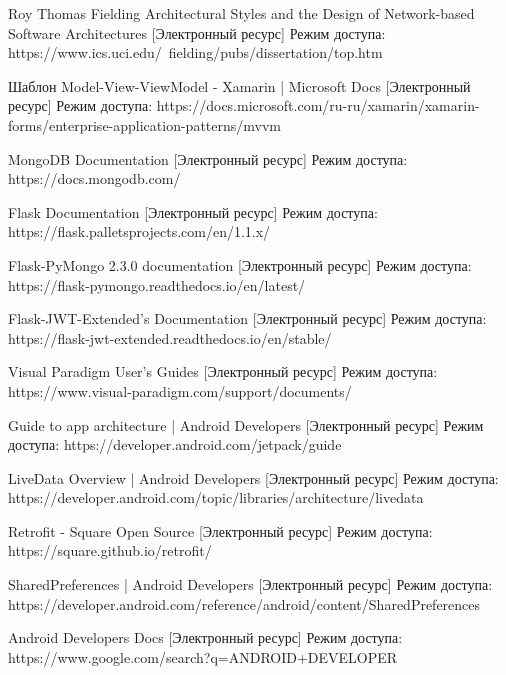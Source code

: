 \begingroup 
\renewcommand{\section}[2]{\anonsection{список использованных источников}}
\begin{thebibliography}{00}
	
Roy Thomas Fielding
Architectural Styles and the Design of Network-based Software Architectures
[Электронный ресурс] 
Режим доступа: https://www.ics.uci.edu/~fielding/pubs/dissertation/top.htm

Шаблон Model-View-ViewModel - Xamarin | Microsoft Docs
[Электронный ресурс]
Режим доступа:
https://docs.microsoft.com/ru-ru/xamarin/xamarin-forms/enterprise-application-patterns/mvvm

MongoDB Documentation 
[Электронный ресурс]
Режим доступа:
https://docs.mongodb.com/

Flask Documentation
[Электронный ресурс] 
Режим доступа:
https://flask.palletsprojects.com/en/1.1.x/

Flask-PyMongo 2.3.0 documentation
[Электронный ресурс]
Режим доступа:
https://flask-pymongo.readthedocs.io/en/latest/

Flask-JWT-Extended’s Documentation
[Электронный ресурс] 
Режим доступа:
https://flask-jwt-extended.readthedocs.io/en/stable/

Visual Paradigm User's Guides
[Электронный ресурс]
Режим доступа:
https://www.visual-paradigm.com/support/documents/

Guide to app architecture | Android Developers
[Электронный ресурс]
Режим доступа:
https://developer.android.com/jetpack/guide

LiveData Overview | Android Developers
[Электронный ресурс]
Режим доступа:
https://developer.android.com/topic/libraries/architecture/livedata

Retrofit - Square Open Source
[Электронный ресурс]
Режим доступа:
https://square.github.io/retrofit/


SharedPreferences | Android Developers
[Электронный ресурс]
Режим доступа:
https://developer.android.com/reference/android/content/SharedPreferences

Android Developers Docs
[Электронный ресурс]
Режим доступа:
https://www.google.com/search?q=ANDROID+DEVELOPER

\end{thebibliography}

\endgroup

\clearpage